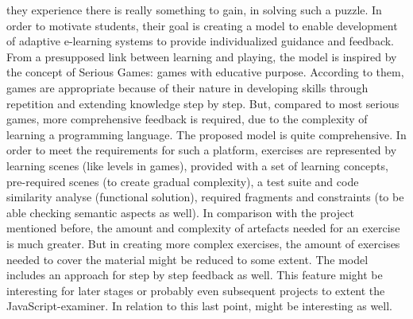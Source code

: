 \documentclass{article}
\begin{document}
they experience there is really something to gain, in solving such a puzzle.
In order to motivate students, their goal is creating a model to enable 
development of adaptive e-learning systems to provide individualized guidance 
and feedback. From a presupposed link between learning and playing, the model
is inspired by the concept of Serious Games: games with educative purpose. 
According to them, games are appropriate because of their nature in developing
skills through repetition and extending knowledge step by step. But, 
compared to most serious games, more comprehensive feedback is 
required, due to the complexity of learning a programming language. The proposed
model is quite comprehensive.
In order to meet the requirements for such a platform, exercises are 
represented by learning scenes (like levels in
games), provided with a set of learning concepts, pre-required scenes (to
create
gradual complexity), a test suite and code similarity analyse (functional 
solution),
required fragments and constraints (to be able checking
semantic aspects as well). In comparison with the 
project mentioned before, the amount and complexity of artefacts needed
for an exercise is
much greater. But in creating more complex exercises, the amount of exercises 
needed to cover the material might be reduced to some extent. The model includes 
an approach for step by step feedback as well. This feature might be interesting 
for later stages or probably even subsequent projects to extent the 
JavaScript-examiner. In relation to this last point, 
\citep{burckhardt2013s}
might be interesting as well.
\end{document}
